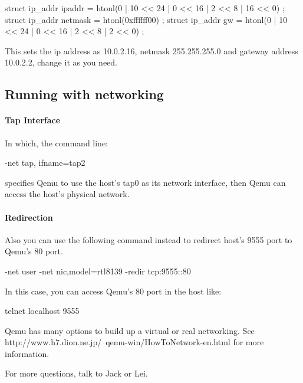 \documentclass[11pt]{article}
\begin{document}
  struct ip\_addr ipaddr = { htonl(0 | 10 << 24 | 0 << 16 | 2 << 8 | 16 << 0) }; 
  struct ip\_addr netmask = { htonl(0xffffff00) }; 
  struct ip\_addr gw = { htonl(0 | 10 << 24 | 0 << 16 | 2 << 8 | 2 << 0) };

This sets the ip address as 10.0.2.16, netmask 255.255.255.0 and gateway address 10.0.2.2, change it as you need.



\subsection{Running with networking}

\paragraph*{Tap Interface}
In which, the command line: 

-net tap, ifname=tap2

specifies Qemu to use the host's tap0 as its network interface, then Qemu can access the host's physical network.

\paragraph*{Redirection}

Also you can use the following command instead to redirect host's 9555 port to Qemu's 80 port.

-net user -net nic,model=rtl8139  -redir tcp:9555::80

In this case, you can access Qemu's 80 port in the host like:

telnet localhost 9555

Qemu has many options to build up a virtual or real networking. See http://www.h7.dion.ne.jp/~qemu-win/HowToNetwork-en.html for more information.






For more questions, talk to Jack or Lei.
\end{document}
